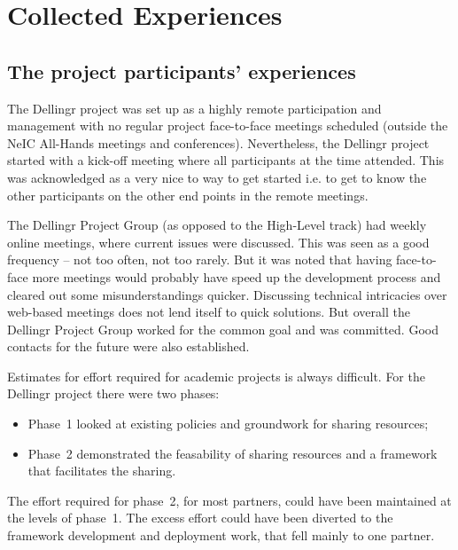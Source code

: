 \documentclass{article}
\newcommand{\dell}{Dellingr\xspace}
\newcommand{\HLT}{High-Level track\xspace}
\begin{document}
    
\section{Collected Experiences}

\subsection{The project participants’ experiences}


The \dell project was set up as a highly remote participation and management with no regular project face-to-face meetings scheduled (outside the NeIC All-Hands meetings and conferences).
Nevertheless, the \dell project started with a kick-off meeting where all participants at the time attended. 
This was acknowledged as a very nice to way to get started i.e. to get to know the other participants on the other end points in the remote meetings.

The \dell Project Group (as opposed to the \HLT) had weekly online meetings, where current issues were discussed. 
This was seen as a good frequency -- not too often, not too rarely.
But it was noted that having face-to-face more meetings would probably have speed up the development process and cleared out some misunderstandings quicker. 
Discussing technical intricacies over web-based meetings does not lend itself to quick solutions.
But overall the \dell 
Project Group worked for the common goal and was committed. 
Good contacts for the future were also established.

Estimates for effort required for academic projects is always difficult.
For the \dell project there were two phases:
\begin{itemize}
\item Phase~1 looked at existing policies and groundwork for sharing resources;
\item Phase~2 demonstrated the feasability of sharing resources and a framework that facilitates the sharing.
\end{itemize}
The effort required for phase~2, for most partners, could have been maintained at the levels of phase~1.
The excess effort could have been diverted to the framework development and deployment work, that fell mainly to one partner.
\end{document}
